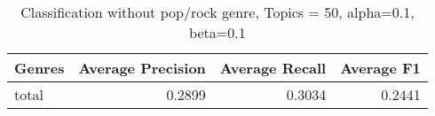 \begin{table}[h!]
\begin{center}
\begin{tabular}{|l|r|r|r|}

\hline
\textbf{Genres} &  \textbf{Average Precision} & \textbf{Average Recall} & \textbf{Average F1} \\
\hline
total& 0.2899 	&0.3034 &	0.2441\\
\hline
\end{tabular}
\caption{Classification without pop/rock genre, Topics = 50, alpha=0.1, beta=0.1}
\end{center}
\end{table}